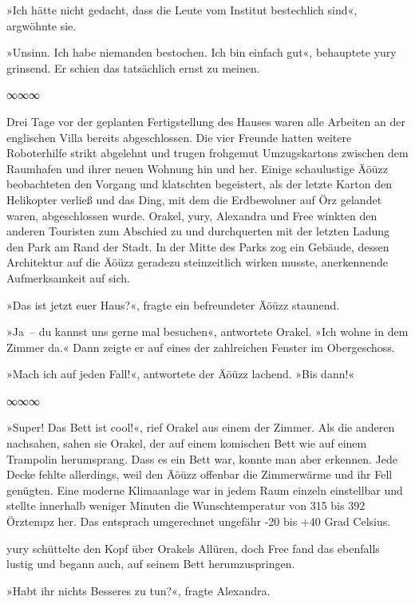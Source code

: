 »Ich hätte nicht gedacht, dass die Leute vom Institut bestechlich sind«, argwöhnte sie.

»Unsinn. Ich habe niemanden bestochen. Ich bin einfach gut«, behauptete yury grinsend. Er schien das tatsächlich ernst zu meinen.

\begin{center}
    ∞∞∞
\end{center}

Drei Tage vor der geplanten Fertigstellung des Hauses waren alle Arbeiten an der englischen Villa bereits abgeschlossen. Die vier Freunde hatten weitere Roboterhilfe strikt abgelehnt und trugen frohgemut Umzugskartons zwischen dem Raumhafen und ihrer neuen Wohnung hin und her. Einige schaulustige Äöüzz beobachteten den Vorgang und klatschten begeistert, als der letzte Karton den Helikopter verließ und das Ding, mit dem die Erdbewohner auf Örz gelandet waren, abgeschlossen wurde. Orakel, yury, Alexandra und Free winkten den anderen Touristen zum Abschied zu und durchquerten mit der letzten Ladung den Park am Rand der Stadt. In der Mitte des Parks zog ein Gebäude, dessen Architektur auf die Äöüzz geradezu steinzeitlich wirken musste, anerkennende Aufmerksamkeit auf sich.

»Das ist jetzt euer Haus?«, fragte ein befreundeter Äöüzz staunend.

»Ja~– du kannst uns gerne mal besuchen«, antwortete Orakel. »Ich wohne in dem Zimmer da.« Dann zeigte er auf eines der zahlreichen Fenster im Obergeschoss.

»Mach ich auf jeden Fall!«, antwortete der Äöüzz lachend. »Bis dann!«

\begin{center}
    ∞∞∞
\end{center}

»Super! Das Bett ist cool!«, rief Orakel aus einem der Zimmer. Als die anderen nachsahen, sahen sie Orakel, der auf einem komischen Bett wie auf einem Trampolin herumsprang. Dass es ein Bett war, konnte man aber erkennen. Jede Decke fehlte allerdings, weil den Äöüzz offenbar die Zimmerwärme und ihr Fell genügten. Eine moderne Klimaanlage war in jedem Raum einzeln einstellbar und stellte innerhalb weniger Minuten die Wunschtemperatur von 315 bis 392 Örztempz her. Das entsprach umgerechnet ungefähr -20 bis +40 Grad Celsius.

yury schüttelte den Kopf über Orakels Allüren, doch Free fand das ebenfalls lustig und begann auch, auf seinem Bett herumzuspringen.

»Habt ihr nichts Besseres zu tun?«, fragte Alexandra.


